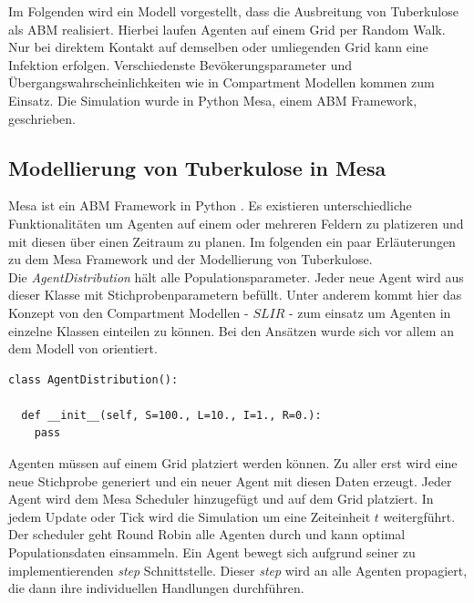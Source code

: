 \documentclass[paper=a4, fontsize=11pt, ngerman, abstract=on]{scrartcl}
\numberwithin{equation}{section} %
\numberwithin{figure}{section} %
\numberwithin{table}{section} %
\begin{document}
Im Folgenden wird ein Modell vorgestellt, dass die Ausbreitung von Tuberkulose als ABM realisiert. Hierbei laufen Agenten auf einem Grid per Random Walk. Nur bei direktem Kontakt auf demselben oder umliegenden Grid kann eine Infektion erfolgen. Verschiedenste Bevökerungsparameter und Übergangswahrscheinlichkeiten wie in Compartment Modellen kommen zum Einsatz. Die Simulation wurde in Python Mesa, einem ABM Framework, geschrieben.

\subsection{Modellierung von Tuberkulose in Mesa}

Mesa ist ein ABM Framework in Python \cite{Mesa}. Es existieren unterschiedliche Funktionalitäten um Agenten auf einem oder mehreren Feldern zu platizeren und mit diesen über einen Zeitraum zu planen. Im folgenden ein paar Erläuterungen zu dem Mesa Framework und der Modellierung von Tuberkulose. \\

Die \textit{AgentDistribution} hält alle Populationsparameter. Jeder neue Agent wird aus dieser Klasse mit Stichprobenparametern befüllt. Unter anderem kommt hier das Konzept von den Compartment Modellen - $SLIR$ - zum einsatz um Agenten in einzelne Klassen einteilen zu können. Bei den Ansätzen wurde sich vor allem an dem Modell von \cite{Perez2009} orientiert.

\begin{lstlisting}[style=python]
class AgentDistribution():

  def __init__(self, S=100., L=10., I=1., R=0.):
    pass
\end{lstlisting}

Agenten müssen auf einem Grid platziert werden können. Zu aller erst wird eine neue Stichprobe generiert und ein neuer Agent mit diesen Daten erzeugt. Jeder Agent wird dem Mesa Scheduler hinzugefügt und auf dem Grid platziert. In jedem Update oder Tick wird die Simulation um eine Zeiteinheit $t$ weitergführt. Der scheduler geht Round Robin alle Agenten  durch und kann optimal Populationsdaten einsammeln. Ein Agent bewegt sich aufgrund seiner zu implementierenden \textit{step} Schnittstelle. Dieser \textit{step} wird an alle Agenten propagiert, die dann ihre individuellen Handlungen durchführen.
\end{document}
